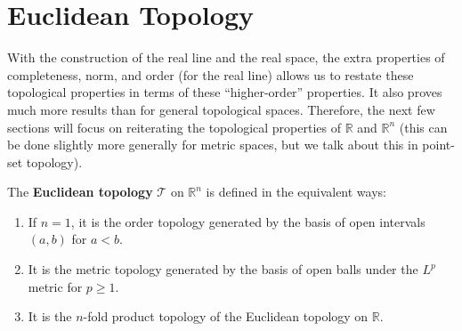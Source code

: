 \section{Euclidean Topology} 

  With the construction of the real line and the real space, the extra properties of completeness, norm, and order (for the real line) allows us to restate these topological properties in terms of these ``higher-order'' properties. It also proves much more results than for general topological spaces. Therefore, the next few sections will focus on reiterating the topological properties of $\mathbb{R}$ and $\mathbb{R}^n$ (this can be done slightly more generally for metric spaces, but we talk about this in point-set topology). 

  \begin{theorem}
    The \textbf{Euclidean topology} $\mathscr{T}$ on $\mathbb{R}^n$ is defined in the equivalent ways: 
    \begin{enumerate}
      \item If $n = 1$, it is the order topology generated by the basis of open intervals $(a, b)$ for $a < b$. 
      \item It is the metric topology generated by the basis of open balls under the $L^p$ metric for $p \geq 1$. 
      \item It is the $n$-fold product topology of the Euclidean topology on $\mathbb{R}$. 
    \end{enumerate}
  \end{theorem}
